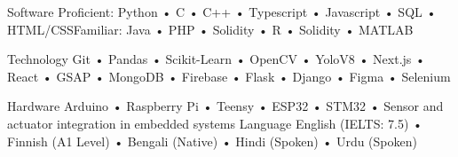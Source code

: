 

\begin{cvskills}

  \vspace{-0.8mm}
  \cvskill
    {Software} %
    {Proficient: Python • C • C++ • Typescript • Javascript • SQL • HTML/CSS\space\space\space Familiar: Java • PHP • Solidity • R • Solidity • MATLAB}%

    \vspace{-0.8mm}
  \cvskill
    {Technology} %
    {Git • Pandas • Scikit-Learn • OpenCV • YoloV8 • Next.js • React • GSAP • MongoDB • Firebase • Flask • Django • Figma • Selenium } %

    \vspace{-0.8mm}
  \cvskill
    {Hardware} %
    {Arduino • Raspberry Pi • Teensy • ESP32 • STM32 • Sensor and actuator integration in embedded systems} %
  \cvskill
    {Language} %
    {English (IELTS: 7.5) • Finnish (A1 Level) • Bengali (Native) • Hindi (Spoken) • Urdu (Spoken) } %

\end{cvskills}
